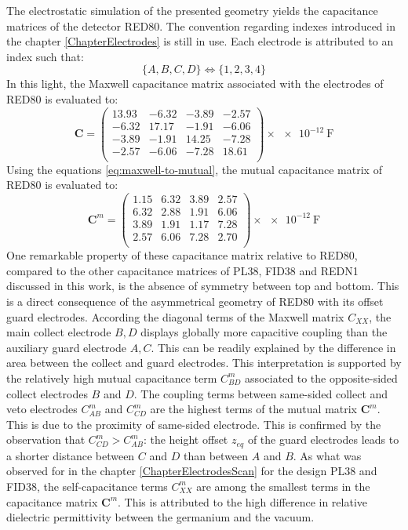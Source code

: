 The electrostatic simulation of the presented geometry yields the capacitance matrices  of the detector RED80. The convention regarding indexes introduced in the chapter \ref{ChapterElectrodes} is still in use. Each electrode is attributed to an index such that:
\begin{equation}
\label{eq:indexes-convention}
\{ A, B, C, D \} \Leftrightarrow \{ 1, 2, 3, 4 \}
\end{equation}
In this light, the Maxwell capacitance matrix associated with the electrodes of RED80 is evaluated to:
\begin{equation}
\label{eq:redn1-maxwell}
\bm{C} = 
\begin{pmatrix}
  13.93 & -6.32 & -3.89 & -2.57\\
  -6.32 & 17.17 & -1.91 & -6.06\\
  -3.89 & -1.91 & 14.25 & -7.28\\
  -2.57 & -6.06 & -7.28 & 18.61\\
\end{pmatrix}
\times \SI{e-12}{\farad}
\end{equation}
Using the equations \ref{eq:maxwell-to-mutual}, the mutual capacitance matrix of RED80 is evaluated to:
\begin{equation}
\label{eq:redn1-mutual}
\bm{C}^m = 
\begin{pmatrix}
  1.15 & 6.32 & 3.89 & 2.57\\
  6.32 & 2.88 & 1.91 & 6.06\\
  3.89 & 1.91 & 1.17 & 7.28\\
  2.57 & 6.06 & 7.28 & 2.70\\
\end{pmatrix}
\times \SI{e-12}{\farad}
\end{equation}
One remarkable property of these capacitance matrix relative to RED80, compared to the other capacitance matrices of PL38, FID38 and REDN1 discussed in this work, is the absence of symmetry between top and bottom. This is a direct consequence of the asymmetrical geometry of RED80 with its offset guard electrodes.  
According the diagonal terms of the Maxwell matrix $C_{XX}$, the main collect electrode $B,D$ displays globally more capacitive coupling than the auxiliary guard electrode $A,C$. This can be readily explained by the difference in area between the collect and guard electrodes. This interpretation is supported by the relatively high mutual capacitance term $C_{BD}^m$ associated to the opposite-sided collect electrodes $B$ and $D$. 
The coupling terms between same-sided collect and veto electrodes $C_{AB}^m$ and  $C_{CD}^m$ are the highest terms of the mutual matrix $\bm{C}^m$. This is due to the proximity of same-sided electrode. This is confirmed by the observation that $C_{CD}^m > C_{AB}^m$: the height offset $z_{eq}$ of the guard electrodes leads to a shorter 
distance between $C$ and $D$ than between $A$ and $B$.
As what was observed for in the chapter \ref{ChapterElectrodesScan} for the design PL38 and FID38, the self-capacitance terms $C_{XX}^m$ are among the smallest terms in the capacitance matrix $\bm{C}^m$. This is attributed to the high difference in relative dielectric permittivity between the germanium and the vacuum.

